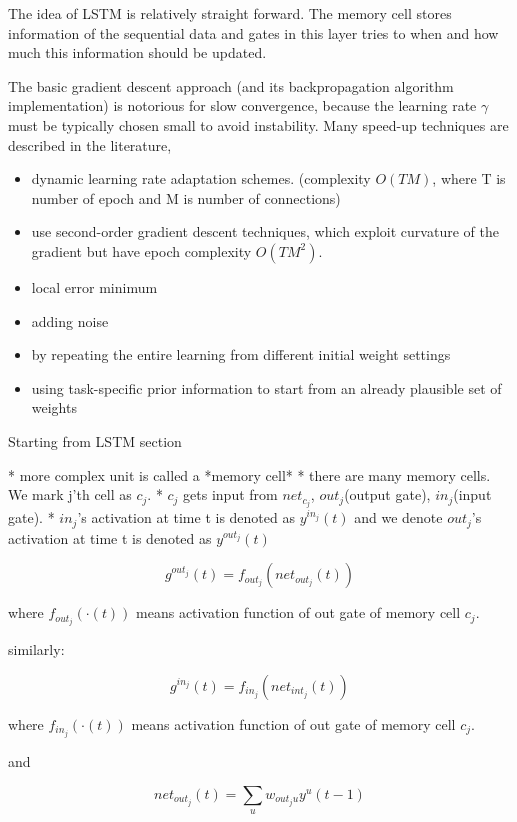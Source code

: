 \documentclass[officiallayout]{tktla}
\begin{document}
The idea of LSTM is relatively straight forward. The memory cell stores information of the sequential data and gates in this layer tries to when and how much this information should be updated.

The basic gradient descent approach (and its backpropagation algorithm implementation) is notorious for slow convergence, because the learning rate $\gamma$ must be typically chosen small to avoid instability. Many speed-up techniques are described in the literature, 

\begin{itemize}
\item dynamic learning rate adaptation schemes. (complexity $O(TM)$, where T is number of epoch and M is number of connections)
\item use second-order gradient descent techniques, which exploit curvature of the gradient but have epoch complexity $O(TM^2)$. 
\item local error minimum
\item adding noise
\item by repeating the entire learning from different initial weight settings
\item using task-specific prior information to start from an already plausible set of weights
\end{itemize}


Starting from LSTM section

* more complex unit is called a *memory cell*
* there are many memory cells. We mark j'th cell as $c_j$.
* $c_j$ gets input from $net_{c_j}$, $out_j$(output gate), $in_j$(input gate).
* $in_j$'s activation at time t is denoted as $y^{in_j}(t)$ and we denote $out_j$'s activation at time t is denoted as $y^{out_j}(t)$

\begin{equation}
g^{out_j}(t) = f_{out_j}(net_{out_j}(t))
\end{equation}


where $f_{out_j}(\cdot (t))$ means activation function of out gate of memory cell $c_j$.

similarly:


\begin{equation}
g^{in_j}(t) = f_{in_j}(net_{int_j}(t))
\end{equation}


where $f_{in_j}(\cdot (t))$ means activation function of out gate of memory cell $c_j$.

and


\begin{equation}
net_{out_j}(t) = \sum_u w_{out_ju}y^u(t-1) \label{eq_netout}
\end{equation}
\end{document}
